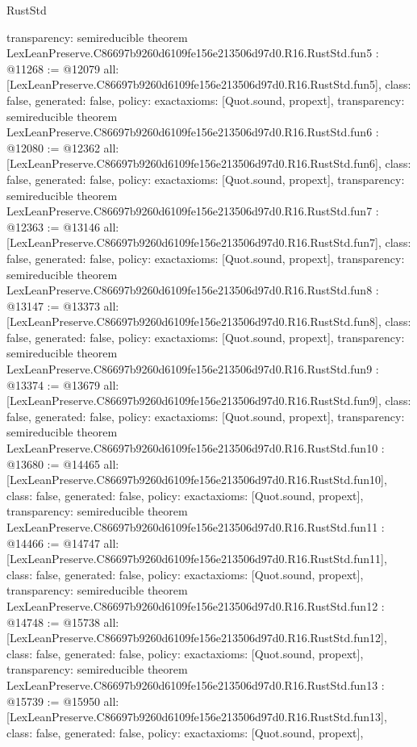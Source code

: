 \begin{lexlean}{RustStd}
\begin{coremodule}
{  transparency: semireducible
}
theorem LexLeanPreserve.C86697b9260d6109fe156e213506d97d0.R16.RustStd.fun5 : @11268 := @12079 {
  all: [LexLeanPreserve.C86697b9260d6109fe156e213506d97d0.R16.RustStd.fun5],
  class: false,
  generated: false,
  policy: exact{axioms: [Quot.sound, propext]},
  transparency: semireducible
}
theorem LexLeanPreserve.C86697b9260d6109fe156e213506d97d0.R16.RustStd.fun6 : @12080 := @12362 {
  all: [LexLeanPreserve.C86697b9260d6109fe156e213506d97d0.R16.RustStd.fun6],
  class: false,
  generated: false,
  policy: exact{axioms: [Quot.sound, propext]},
  transparency: semireducible
}
theorem LexLeanPreserve.C86697b9260d6109fe156e213506d97d0.R16.RustStd.fun7 : @12363 := @13146 {
  all: [LexLeanPreserve.C86697b9260d6109fe156e213506d97d0.R16.RustStd.fun7],
  class: false,
  generated: false,
  policy: exact{axioms: [Quot.sound, propext]},
  transparency: semireducible
}
theorem LexLeanPreserve.C86697b9260d6109fe156e213506d97d0.R16.RustStd.fun8 : @13147 := @13373 {
  all: [LexLeanPreserve.C86697b9260d6109fe156e213506d97d0.R16.RustStd.fun8],
  class: false,
  generated: false,
  policy: exact{axioms: [Quot.sound, propext]},
  transparency: semireducible
}
theorem LexLeanPreserve.C86697b9260d6109fe156e213506d97d0.R16.RustStd.fun9 : @13374 := @13679 {
  all: [LexLeanPreserve.C86697b9260d6109fe156e213506d97d0.R16.RustStd.fun9],
  class: false,
  generated: false,
  policy: exact{axioms: [Quot.sound, propext]},
  transparency: semireducible
}
theorem LexLeanPreserve.C86697b9260d6109fe156e213506d97d0.R16.RustStd.fun10 : @13680 := @14465 {
  all: [LexLeanPreserve.C86697b9260d6109fe156e213506d97d0.R16.RustStd.fun10],
  class: false,
  generated: false,
  policy: exact{axioms: [Quot.sound, propext]},
  transparency: semireducible
}
theorem LexLeanPreserve.C86697b9260d6109fe156e213506d97d0.R16.RustStd.fun11 : @14466 := @14747 {
  all: [LexLeanPreserve.C86697b9260d6109fe156e213506d97d0.R16.RustStd.fun11],
  class: false,
  generated: false,
  policy: exact{axioms: [Quot.sound, propext]},
  transparency: semireducible
}
theorem LexLeanPreserve.C86697b9260d6109fe156e213506d97d0.R16.RustStd.fun12 : @14748 := @15738 {
  all: [LexLeanPreserve.C86697b9260d6109fe156e213506d97d0.R16.RustStd.fun12],
  class: false,
  generated: false,
  policy: exact{axioms: [Quot.sound, propext]},
  transparency: semireducible
}
theorem LexLeanPreserve.C86697b9260d6109fe156e213506d97d0.R16.RustStd.fun13 : @15739 := @15950 {
  all: [LexLeanPreserve.C86697b9260d6109fe156e213506d97d0.R16.RustStd.fun13],
  class: false,
  generated: false,
  policy: exact{axioms: [Quot.sound, propext]},
}
\end{coremodule}
\end{lexlean}
